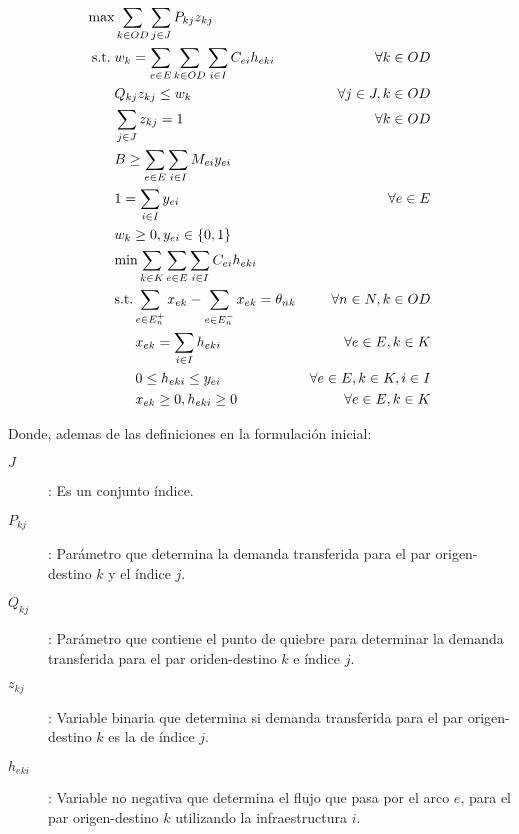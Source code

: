 \documentclass{article}
\newcommand{\modelspace}{\hspace{1.5em}}
\begin{document}
  \begin{align}
    \text{max}    & \sum_{k \in OD} \sum_{j \in J} P_{kj} z_{kj}                                     & \label{eq:objective1lvlfinal} \\
    \text{s.t.}\; & w_k = \sum_{e \in E} \sum_{k \in OD} \sum_{i \in I} C_{ei} h_{eki}               & \forall k \in OD \label{eq:shortestpathfinal} \\
                  & Q_{kj} z_{kj} \leq w_k                                                           & \forall j \in J, k \in OD \label{eq:breakpoints} \\
                  & \sum_{j \in J} z_{kj} = 1                                                        & \forall k \in OD \label{eq:singularbreakpoint} \\
                  & B \geq \sum_{e \in E} \sum_{i \in I} M_{ei}y_{ei}                                & \label{eq:respectbudgetfinal} \\
                  & 1 = \sum_{i \in I} y_{ei}                                                        & \forall e \in E \label{eq:alwaysoneyfinal} \\
                  & w_k \geq 0, y_{ei} \in \left\{ 0, 1 \right\}                                     & \nonumber \\
                  & \text{min} \sum_{k \in K} \sum_{e \in E} \sum_{i \in I} C_{ei} h_{eki}           & \label{eq:subproblemfinal} \\
                  & \text{s.t.} \sum_{e \in E_n^+} x_{ek} - \sum_{e \in E_n^-} x_{ek} = \theta_{nk}  & \forall n \in N, k \in OD \label{eq:flowbalancefinal} \\
                  & \modelspace x_{ek} = \sum_{i \in I} h_{eki}                                      & \forall e \in E, k \in K \label{eq:flowactivation} \\
                  & \modelspace 0 \leq h_{eki} \leq y_{ei}                                           & \forall e \in E, k \in K, i \in I \label{eq:respectinfra} \\
                  & \modelspace x_{ek} \geq 0, h_{eki} \geq 0                                        & \forall e \in E, k \in K \nonumber
  \end{align}

  Donde, ademas de las definiciones en la formulación inicial:

  \begin{description}
    \item[$J$]: Es un conjunto índice.
    \item[$P_{kj}$]: Parámetro que determina la demanda transferida para el par origen-destino $k$ y el índice $j$.
    \item[$Q_{kj}$]: Parámetro que contiene el punto de quiebre para determinar la demanda transferida para el par oriden-destino $k$ e índice $j$. 
    \item[$z_{kj}$]: Variable binaria que determina si demanda transferida para el par origen-destino $k$ es la de índice $j$.
    \item[$h_{eki}$]: Variable no negativa que determina el flujo que pasa por el arco $e$, para el par origen-destino $k$ utilizando la infraestructura $i$. 
  \end{description}
\end{document}

